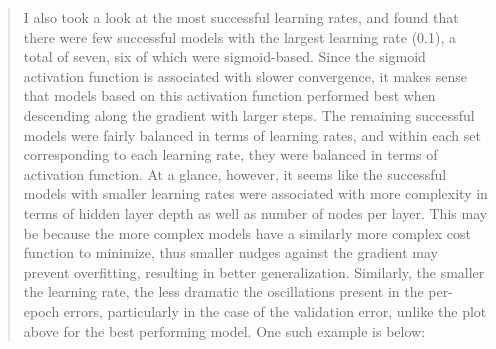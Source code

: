 \documentclass{article}
\begin{document}
\begin{quote}
I also took a look at the most successful learning rates, and found that there were few successful models with the largest learning rate (0.1), a total of seven, six of which were sigmoid-based. Since the sigmoid activation function is associated with slower convergence, it makes sense that models based on this activation function performed best when descending along the gradient with larger steps. The remaining successful models were fairly balanced in terms of learning rates, and within each set corresponding to each learning rate, they were balanced in terms of activation function. At a glance, however, it seems like the successful models with smaller learning rates were associated with more complexity in terms of hidden layer depth as well as number of nodes per layer. This may be because the more complex models have a similarly more complex cost function to minimize, thus smaller nudges against the gradient may prevent overfitting, resulting in better generalization.  Similarly, the smaller the learning rate, the less dramatic the oscillations present in the per-epoch errors, particularly in the case of the validation error, unlike the plot above for the best performing model. One such example is below:


\end{quote}
\end{document}
